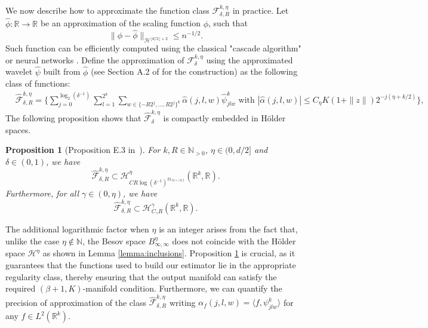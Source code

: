 \documentclass[10pt]{article}
\newtheorem{proposition}{Proposition}
\begin{document}
We now describe how to approximate the function class \( \mathcal{F}_{\delta,R}^{k,\eta} \) in practice. Let \( \hat{\phi}:\mathbb{R} \rightarrow \mathbb{R} \) be an approximation of the scaling function \( \phi \), such that 
\begin{equation}\label{eq:approxipsipaper2}
\|\phi-\hat{\phi}\|_{\mathcal{H}^{\lfloor d/2 \rfloor +2}} \leq n^{-1/2}.
\end{equation}
Such function can be efficiently computed using the classical "cascade algorithm" \citep{daubechies1991two} or neural networks \citep{stephanovitch2023wasserstein}. 
Define the approximation of $\mathcal{F}_\delta^{k,\eta}$ using the approximated wavelet $\hat{\psi}$ built from $\hat{\phi}$ (see Section A.2 of \cite{stephanovitch2023wasserstein} for the construction) as the following class of functions:
\begin{align}\label{eq:fdeltaperapprox}
&\hat{\mathcal{F}}_{\delta,R}^{k,\eta}=\Big\{\sum \limits_{j=0}^{\log_2(\delta^{-1})} \sum \limits_{l=1}^{2^k} \sum \limits_{w\in \{-R2^j,...,R2^j\}^k} \hat{\alpha}(j,l,w) \hat{\psi}^k_{jlw} \text{ with } |\hat{\alpha}(j,l,w)|\leq C_\eta K(1+\|z\|)2^{-j(\eta+k/2)}\Big\},
\end{align}
The following proposition shows that \( \hat{\mathcal{F}}_\delta^{k,\eta} \) is compactly embedded in Hölder spaces.
\begin{proposition}[Proposition E.3 in~\cite{stephanovitch2023wasserstein}]\label{prop:reguofG}
    For $k,R\in \mathbb{N}_{>0}$, $\eta\in (0,d/2]$ and $\delta\in(0,1)$, we have 
    $$\hat{\mathcal{F}}_{\delta,R}^{k,\eta}\subset\mathcal{H}^{\eta}_{CR\log(\delta^{-1})^{2\mathds{1}_{\{\eta=\lfloor \eta \rfloor\}}}}(\mathbb{R}^k,\mathbb{R}).$$
    Furthermore, for all $\gamma \in (0,\eta)$, we have
     $$\hat{\mathcal{F}}_{\delta,R}^{k,\eta}\subset\mathcal{H}^{\gamma}_{C_\gamma R}(\mathbb{R}^k,\mathbb{R}).$$
\end{proposition}
The additional logarithmic factor when \(\eta\) is an integer arises from the fact that, unlike the case \(\eta \notin \mathbb{N}\), the Besov space \(B^\eta_{\infty,\infty}\) does not coincide with the Hölder space \(\mathcal{H}^\eta\) as shown in Lemma \ref{lemma:inclusions}. Proposition \ref{prop:reguofG} is crucial, as it guarantees that the functions used to build our estimator lie in the appropriate regularity class, thereby ensuring that the output manifold can satisfy the required \( (\beta+1, K) \)-manifold condition.
Furthermore, we can quantify the precision of approximation of the class $\hat{\mathcal{F}}_{\delta,R}^{k,\eta}$ writing $\alpha_f(j,l,w)=\langle f, \psi^k_{jlw}\rangle$ for any $f\in L^2(\mathbb{R}^k)$.
\end{document}
